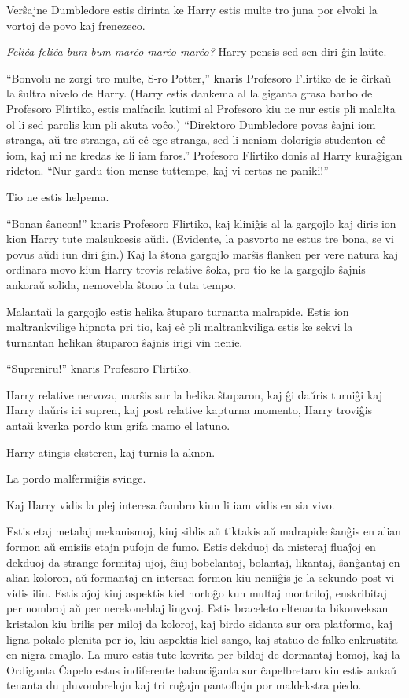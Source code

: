 Verŝajne Dumbledore estis dirinta ke Harry estis multe tro juna por
elvoki la vortoj de povo kaj frenezeco.

\emph{Feliĉa feliĉa bum bum marĉo marĉo marĉo?} Harry pensis sed sen
diri ĝin laŭte.

``Bonvolu ne zorgi tro multe, S-ro Potter,'' knaris Profesoro Flirtiko
de ie ĉirkaŭ la ŝultra nivelo de Harry. (Harry estis dankema al la
giganta grasa barbo de Profesoro Flirtiko, estis malfacila kutimi al
Profesoro kiu ne nur estis pli malalta ol li sed parolis kun pli akuta
voĉo.) ``Direktoro Dumbledore povas ŝajni iom stranga, aŭ tre stranga,
aŭ eĉ ege stranga, sed li neniam dolorigis studenton eĉ iom, kaj mi ne
kredas ke li iam faros.'' Profesoro Flirtiko donis al Harry kuraĝigan
rideton. ``Nur gardu tion mense tuttempe, kaj vi certas ne paniki!''

Tio ne estis helpema.

``Bonan ŝancon!'' knaris Profesoro Flirtiko, kaj kliniĝis al la
gargojlo kaj diris ion kion Harry tute malsukcesis aŭdi. (Evidente, la
pasvorto ne estus tre bona, se vi povus aŭdi iun diri ĝin.) Kaj la
ŝtona gargojlo marŝis flanken per vere natura kaj ordinara movo kiun
Harry trovis relative ŝoka, pro tio ke la gargojlo ŝajnis ankoraŭ
solida, nemovebla ŝtono la tuta tempo.

Malantaŭ la gargojlo estis helika ŝtuparo turnanta malrapide. Estis
ion maltrankvilige hipnota pri tio, kaj eĉ pli maltrankviliga estis ke
sekvi la turnantan helikan ŝtuparon ŝajnis irigi vin nenie.

``Supreniru!'' knaris Profesoro Flirtiko.

Harry relative nervoza, marŝis sur la helika ŝtuparon, kaj ĝi daŭris
turniĝi kaj Harry daŭris iri supren, kaj post relative kapturna
momento, Harry troviĝis antaŭ kverka pordo kun grifa mamo el latuno.


Harry atingis eksteren, kaj turnis la aknon.

La pordo malfermiĝis svinge.

Kaj Harry vidis la plej interesa ĉambro kiun li iam vidis en sia vivo.

Estis etaj metalaj mekanismoj, kiuj siblis aŭ tiktakis aŭ malrapide
ŝanĝis en alian formon aŭ emisiis etajn pufojn de fumo.  Estis dekduoj
da misteraj fluaĵoj en dekduoj da strange formitaj ujoj, ĉiuj
bobelantaj, bolantaj, likantaj, ŝanĝantaj en alian koloron, aŭ
formantaj en intersan formon kiu neniiĝis je la sekundo post vi vidis
ilin. Estis aĵoj kiuj aspektis kiel horloĝo kun multaj montriloj,
enskribitaj per nombroj aŭ per nerekoneblaj lingvoj. Estis braceleto
eltenanta bikonveksan kristalon kiu brilis per miloj da koloroj, kaj
birdo sidanta sur ora platformo, kaj ligna pokalo plenita per io, kiu
aspektis kiel sango, kaj statuo de falko enkrustita en nigra
emajlo. La muro estis tute kovrita per bildoj de dormantaj homoj, kaj
la Ordiganta Ĉapelo estus indiferente balanciĝanta sur ĉapelbretaro
kiu estis ankaŭ tenanta du pluvombrelojn kaj tri ruĝajn pantoflojn por
maldekstra piedo.

